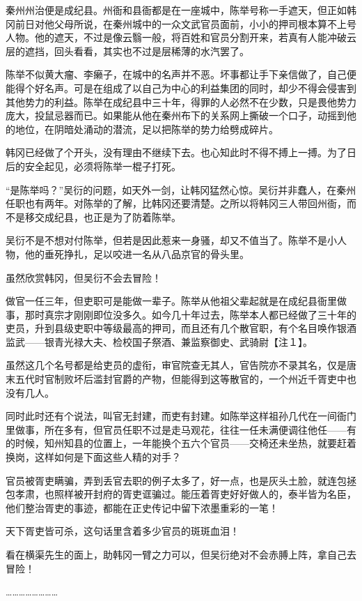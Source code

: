 秦州州治便是成纪县。州衙和县衙都是在一座城中，陈举号称一手遮天，但正如韩冈前日对他父母所说，在秦州城中的一众文武官员面前，小小的押司根本算不上号人物。他的遮天，不过是像云翳一般，将百姓和官员分割开来，若真有人能冲破云层的遮挡，回头看看，其实也不过是层稀薄的水汽罢了。

陈举不似黄大瘤、李癞子，在城中的名声并不恶。坏事都让手下亲信做了，自己便能得个好名声。可是在组成了以自己为中心的利益集团的同时，却少不得会侵害到其他势力的利益。陈举在成纪县中三十年，得罪的人必然不在少数，只是畏他势力庞大，投鼠忌器而已。如果能从他在秦州布下的关系网上撕破一个口子，动摇到他的地位，在阴暗处涌动的潜流，足以把陈举的势力给劈成碎片。

韩冈已经做了个开头，没有理由不继续下去。也心知此时不得不搏上一搏。为了日后的安全起见，必须将陈举一棍子打死。

“是陈举吗？”吴衍的问题，如天外一剑，让韩冈猛然心惊。吴衍并非蠢人，在秦州任职也有两年。对陈举的了解，比韩冈还要清楚。之所以将韩冈三人带回州衙，而不是移交成纪县，也正是为了防着陈举。

吴衍不是不想对付陈举，但若是因此惹来一身骚，却又不值当了。陈举不是小人物，他的垂死挣扎，足以咬进一名从八品京官的骨头里。

虽然欣赏韩冈，但吴衍不会去冒险！

做官一任三年，但吏职可是能做一辈子。陈举从他祖父辈起就是在成纪县衙里做事，那时真宗才刚刚即位没多久。如今几十年过去，陈举本人都已经做了三十年的吏员，升到县级吏职中等级最高的押司，而且还有几个散官职，有个名目唤作银酒监武——银青光禄大夫、检校国子祭酒、兼监察御史、武骑尉【注１】。

虽然这几个名号都是给吏员的虚衔，审官院查无其人，官告院亦不录其名，仅是唐末五代时官制败坏后滥封官爵的产物，但能得到这等散官的，一个州近千胥吏中也没有几人。

同时此时还有个说法，叫官无封建，而吏有封建。如陈举这样祖孙几代在一间衙门里做事，所在多有，但官员任职不过是走马观花，往往一任未满便调往他任——有的时候，知州知县的位置上，一年能换个五六个官员——交椅还未坐热，就要赶着换岗，这样如何是下面这些人精的对手？

官员被胥吏瞒骗，弄到丢官去职的例子太多了，好一点，也是灰头土脸，就连包拯包孝肃，也照样被开封府的胥吏诓骗过。能压着胥吏好好做人的，泰半皆为名臣，他们整治胥吏的事迹，都能在正史传记中留下浓墨重彩的一笔！

天下胥吏皆可杀，这句话里含着多少官员的斑斑血泪！

看在横渠先生的面上，助韩冈一臂之力可以，但吴衍绝对不会赤膊上阵，拿自己去冒险！

……………………

